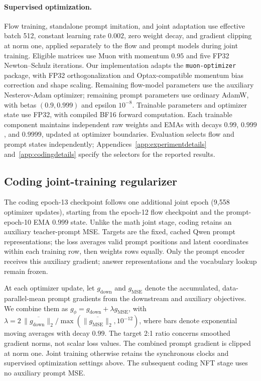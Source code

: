 \documentclass{article}
\begin{document}
\paragraph{Supervised optimization.}
Flow training, standalone prompt imitation, and joint adaptation use effective batch 512, constant learning rate $0.002$, zero weight decay, and gradient clipping at norm one, applied separately to the flow and prompt models during joint training. Eligible matrices use Muon \citep{muon} with momentum $0.95$ and five FP32 Newton--Schulz iterations. Our implementation adapts the \texttt{muon-optimizer} package, with FP32 orthogonalization and Optax-compatible momentum bias correction and shape scaling. Remaining flow-model parameters use the auxiliary Nesterov-Adam optimizer; remaining prompt parameters use ordinary AdamW, with betas $(0.9,0.999)$ and epsilon $10^{-8}$. Trainable parameters and optimizer state use FP32, with compiled BF16 forward computation. Each trainable component maintains independent raw weights and EMAs with decays $0.99$, $0.999$, and $0.9999$, updated at optimizer boundaries. Evaluation selects flow and prompt states independently; Appendices~\ref{app:experimentdetails} and~\ref{app:codingdetails} specify the selectors for the reported results.

\subsection{Coding joint-training regularizer}
\label{app:codingtraining}

The coding epoch-13 checkpoint follows one additional joint epoch (9,558 optimizer updates), starting from the epoch-12 flow checkpoint and the prompt-epoch-10 EMA $0.999$ state. Unlike the math joint stage, coding retains an auxiliary teacher-prompt MSE. Targets are the fixed, cached Qwen prompt representations; the loss averages valid prompt positions and latent coordinates within each training row, then weights rows equally. Only the prompt encoder receives this auxiliary gradient; answer representations and the vocabulary lookup remain frozen.

At each optimizer update, let $g_{\mathrm{down}}$ and $g_{\mathrm{MSE}}$ denote the accumulated, data-parallel-mean prompt gradients from the downstream and auxiliary objectives. We combine them as $g_\phi=g_{\mathrm{down}}+\lambda g_{\mathrm{MSE}}$, with $\lambda=2\,\overline{\|g_{\mathrm{down}}\|_2}/\max(\overline{\|g_{\mathrm{MSE}}\|_2},10^{-12})$, where bars denote exponential moving averages with decay $0.99$. The target 2:1 ratio concerns smoothed gradient norms, not scalar loss values. The combined prompt gradient is clipped at norm one. Joint training otherwise retains the synchronous clocks and supervised optimization settings above. The subsequent coding NFT stage uses no auxiliary prompt MSE.
\end{document}
